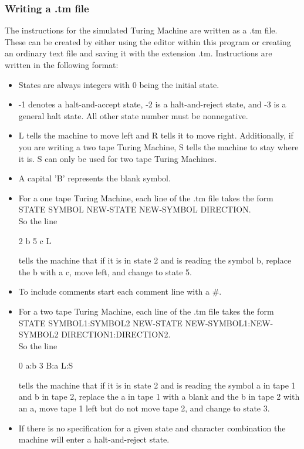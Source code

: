 \documentclass[12pt,letterpaper]{article}
\begin{document}
	\subsubsection{Writing a .tm file}
	\noindent The instructions for the simulated Turing Machine are written as a .tm file. These can be created by either using the editor within this program or creating an ordinary text file and saving it with the extension .tm. Instructions are written in the following format:
	\begin{itemize}
		\item States are always integers with 0 being the initial state.
		\item -1 denotes a halt-and-accept state, -2 is a halt-and-reject state, and -3 is a general halt state. All other state number must be nonnegative.
		\item L tells the machine to move left and R tells it to move right. Additionally, if you are writing a two tape Turing Machine, S tells the machine to stay where it is. S can only be used for two tape Turing Machines.
		\item A capital 'B' represents the blank symbol.
		\item For a one tape Turing Machine, each line of the .tm file takes the form \\ STATE  SYMBOL  NEW-STATE  NEW-SYMBOL  DIRECTION.\\ So the line 
		\begin{center}
			2 b 5 c L 
		\end{center}
		tells the machine that if it is in state 2 and is reading the symbol b, replace the b with a c, move left, and change to state 5.
		\item To include comments start each comment line with a \#.
		\item For a two tape Turing Machine, each line of the .tm file takes the form STATE SYMBOL1:SYMBOL2 NEW-STATE NEW-SYMBOL1:NEW-SYMBOL2  DIRECTION1:DIRECTION2.\\ So the line
		\begin{center}
			0 a:b 3 B:a L:S
		\end{center}
		tells the machine that if it is in state 2 and is reading the symbol a in tape 1 and b in tape 2, replace the a in tape 1 with a blank and the  b in tape 2 with an a, move tape 1 left but do not move tape 2, and change to state 3.
		\item If there is no specification for a given state and character combination the machine will enter a halt-and-reject state.
	\end{itemize}
	
\end{document}

